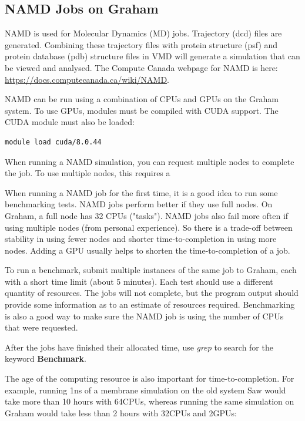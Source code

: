\documentclass[12pt]{article}
\begin{document}
\subsection{NAMD Jobs on Graham}

\quad NAMD is used for Molecular Dynamics (MD) jobs. Trajectory (dcd) files are generated. Combining these trajectory files with protein structure (psf) and protein database (pdb) structure files in VMD will generate a simulation that can be viewed and analysed. The Compute Canada webpage for NAMD is here: \url{https://docs.computecanada.ca/wiki/NAMD}. 

\quad NAMD can be run using a combination of CPUs and GPUs on the Graham system. To use GPUs, modules must be compiled with CUDA support. The CUDA module must also be loaded:

\begin{lstlisting}[numbers=none]
module load cuda/8.0.44
\end{lstlisting}

\quad When running a NAMD simulation, you can request multiple nodes to complete the job. To use multiple nodes, this requires a 

\quad When running a NAMD job for the first time, it is a good idea to run some benchmarking tests. NAMD jobs perform better if they use full nodes. On Graham, a full node has 32 CPUs ("tasks"). NAMD jobs also fail more often if using multiple nodes (from personal experience). So there is a trade-off between stability in using fewer nodes and shorter time-to-completion in using more nodes. Adding a GPU usually helps to shorten the time-to-completion of a job.

\quad To run a benchmark, submit multiple instances of the same job to Graham, each with a short time limit (about 5 minutes). Each test should use a different quantity of resources. The jobs will not complete,  but the program output should provide some information as to an estimate of resources required. Benchmarking is also a good way to make sure the NAMD job is using the number of CPUs that were requested.

\quad After the jobs have finished their allocated time, use \textit{grep} to search for the keyword \textbf{Benchmark}.


\quad The age of the computing resource is also important for time-to-completion. For example, running 1ns of a membrane simulation on the old system Saw would take more than 10 hours with 64CPUs, whereas running the same simulation on Graham would take less than 2 hours with 32CPUs and 2GPUs: 
\end{document}

